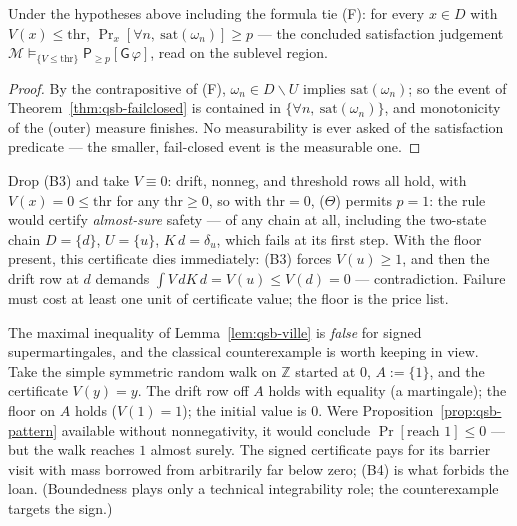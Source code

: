 \begin{bprop}\label{prop:qsb-sound}
Under the hypotheses above including the formula tie (F): for every
$x \in D$ with $V(x) \le \mathrm{thr}$,
$\Pr_x[\forall n,\ \mathrm{sat}(\omega_n)] \ge p$ --- the concluded
satisfaction judgement
$\mathcal{M} \vDash_{\{V \le \mathrm{thr}\}}
\mathsf{P}_{\ge p}[\mathsf{G}\,\varphi]$, read on the sublevel region.
\end{bprop}
\begin{proof}
By the contrapositive of (F), $\omega_n \in D \smallsetminus U$ implies
$\mathrm{sat}(\omega_n)$; so the event of
Theorem~\ref{thm:qsb-failclosed} is contained in
$\{\forall n,\ \mathrm{sat}(\omega_n)\}$, and monotonicity of the
(outer) measure finishes. No measurability is ever asked of the
satisfaction predicate --- the smaller, fail-closed event is the
measurable one.
\end{proof}

\begin{bremark}\label{rem:qsb-floors}
Drop (B3) and take $V \equiv 0$: drift, nonneg, and threshold rows all
hold, with $V(x) = 0 \le \mathrm{thr}$ for any $\mathrm{thr} \ge 0$, so
with $\mathrm{thr} = 0$, ($\Theta$) permits $p = 1$: the rule would
certify \emph{almost-sure} safety --- of any chain at all, including the
two-state chain $D = \{d\}$, $U = \{u\}$, $K\,d = \delta_u$, which fails
at its first step. With the floor present, this certificate dies
immediately: (B3) forces $V(u) \ge 1$, and then the drift row at $d$
demands $\int V\,dK\,d = V(u) \le V(d) = 0$ --- contradiction. Failure
must cost at least one unit of certificate value; the floor is the
price list.
\end{bremark}

\begin{bremark}\label{rem:qsb-nonnegs}
The maximal inequality of Lemma~\ref{lem:qsb-ville} is \emph{false} for
signed supermartingales, and the classical counterexample is worth
keeping in view. Take the simple symmetric random walk on $\mathbb{Z}$ started
at $0$, $A := \{1\}$, and the certificate $V(y) = y$. The drift row off
$A$ holds with equality (a martingale); the floor on $A$ holds
($V(1) = 1$); the initial value is $0$. Were
Proposition~\ref{prop:qsb-pattern} available without nonnegativity, it
would conclude $\Pr[\text{reach } 1] \le 0$ --- but the walk reaches $1$
almost surely. The signed certificate pays for its barrier visit with
mass borrowed from arbitrarily far below zero; (B4) is what forbids the
loan. (Boundedness plays only a technical integrability role; the
counterexample targets the sign.)
\end{bremark}

